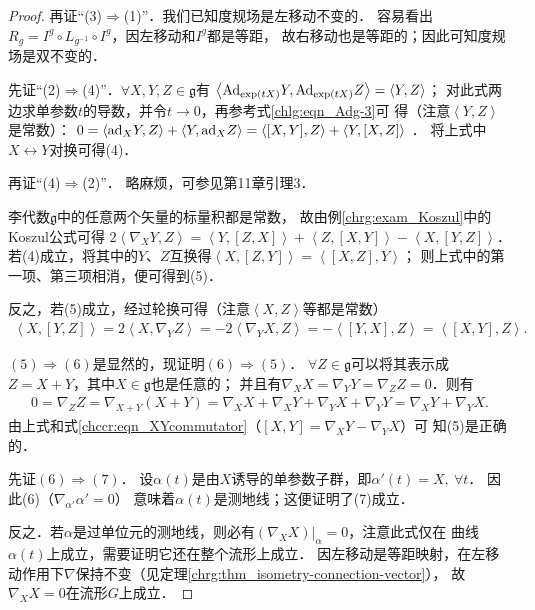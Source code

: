 \begin{proof}
    再证“(3)$\Rightarrow$(1)”．我们已知度规场是左移动不变的．
    容易看出$R_g = I^g\circ L_{g^{-1}}\circ I^g$，因左移动和$I^g$都是等距，
    故右移动也是等距的；因此可知度规场是双不变的．
    
    
    先证“(2)$\Rightarrow$(4)”．$\forall X,Y,Z\in \mathfrak{g}$有
    $\left<{\rm Ad}_{\exp(tX)}Y,{\rm Ad}_{\exp(tX)}Z\right>=\left<Y,Z\right>$；
    对此式两边求单参数$t$的导数，并令$t\to 0$，再参考式\eqref{chlg:eqn_Adg-3}可
    得（注意$\left<Y,Z\right>$是常数）：
    $ 0= \left<{\rm ad}_{X}Y,Z\right>+\left<Y,{\rm ad}_X Z\right>
    =\left<[X,Y],Z\right> + \left<Y,[X,Z]\right> $ ．
    将上式中$X\leftrightarrow Y$对换可得(4)．
    
    再证“(4)$\Rightarrow$(2)”．    略麻烦，可参见\parencite{oneill1983}第11章引理3．
    
    李代数$\mathfrak{g}$中的任意两个矢量的标量积都是常数，
    故由例\ref{chrg:exam_Koszul}中的Koszul公式可得
    $ 2 \left< \nabla_X Y, Z\right> =  \left<Y, [Z,X]\right> + \left<Z, [X,Y]\right> - \left<X, [Y,Z]\right> $．
    若(4)成立，将其中的$Y$、$Z$互换得$\left<X,[Z,Y]\right>=\left<[X,Z],Y\right>$；
    则上式中的第一项、第三项相消，便可得到(5)．
    
    反之，若(5)成立，经过轮换可得（注意$\left< X,Z\right>$等都是常数）
    \begin{align*}
        \left< X,[Y,Z]\right> = 2 \left<X, \nabla_Y Z \right> 
        =- 2 \left<\nabla_Y X, Z \right> 
        =- \left< [Y,X], Z \right> = \left< [X,Y], Z \right> .
    \end{align*}
    
    
    $(5)\Rightarrow (6)$是显然的，现证明$(6)\Rightarrow (5)$．
    $\forall Z\in \mathfrak{g}$可以将其表示成$Z=X+Y$，其中$X\in \mathfrak{g}$也是任意的；
    并且有$\nabla_X X =\nabla_Y Y =\nabla_Z Z =0$．则有
    \begin{align*}
        0=\nabla_Z Z =\nabla_{X+Y}(X+Y)= \nabla_X X+\nabla_X Y+\nabla_Y X+\nabla_Y Y
        =\nabla_X Y+\nabla_Y X .
    \end{align*}
    由上式和式\eqref{chccr:eqn_XYcommutator}（$\left[ {X,Y} \right] = \nabla_X Y - \nabla_Y X$）可
    知(5)是正确的．
    
    先证$(6)\Rightarrow (7)$．
    设$\alpha(t)$是由$X$诱导的单参数子群，即$\alpha'(t)=X,\ \forall t$．
    因此(6)（$\nabla_{\alpha'} \alpha'=0$）
    意味着$\alpha(t)$是测地线；这便证明了(7)成立．
    
    反之．若$\alpha$是过单位元的测地线，则必有$(\nabla_X X)|_{\alpha}=0$，注意此式仅在
    曲线$\alpha(t)$上成立，需要证明它还在整个流形上成立．
    因左移动是等距映射，在左移动作用下$\nabla$保持不变（见定理\ref{chrg:thm_isometry-connection-vector}），
    故$\nabla_X X=0$在流形$G$上成立．    
\end{proof}

